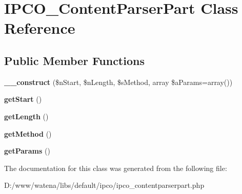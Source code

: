 \hypertarget{class_i_p_c_o___content_parser_part}{\section{I\-P\-C\-O\-\_\-\-Content\-Parser\-Part Class Reference}
\label{class_i_p_c_o___content_parser_part}
}
\subsection*{Public Member Functions}
\begin{DoxyCompactItemize}
\item 
\hypertarget{class_i_p_c_o___content_parser_part_a498d288bf104e4816d20548f2dba801f}{{\bfseries \-\_\-\-\_\-construct} (\$n\-Start, \$n\-Length, \$s\-Method, array \$a\-Params=array())}\label{class_i_p_c_o___content_parser_part_a498d288bf104e4816d20548f2dba801f}

\item 
\hypertarget{class_i_p_c_o___content_parser_part_ab5c89860a31a83016e14b6324b01b031}{{\bfseries get\-Start} ()}\label{class_i_p_c_o___content_parser_part_ab5c89860a31a83016e14b6324b01b031}

\item 
\hypertarget{class_i_p_c_o___content_parser_part_a29eb2064d0c5c701f3b61d142ba79dc8}{{\bfseries get\-Length} ()}\label{class_i_p_c_o___content_parser_part_a29eb2064d0c5c701f3b61d142ba79dc8}

\item 
\hypertarget{class_i_p_c_o___content_parser_part_ad3c00520bed3da649b8beaebb53098d6}{{\bfseries get\-Method} ()}\label{class_i_p_c_o___content_parser_part_ad3c00520bed3da649b8beaebb53098d6}

\item 
\hypertarget{class_i_p_c_o___content_parser_part_a3accae2535c178e2ea8395b1e80ce26d}{{\bfseries get\-Params} ()}\label{class_i_p_c_o___content_parser_part_a3accae2535c178e2ea8395b1e80ce26d}

\end{DoxyCompactItemize}


The documentation for this class was generated from the following file\-:\begin{DoxyCompactItemize}
\item 
D\-:/www/watena/libs/default/ipco/ipco\-\_\-contentparserpart.\-php\end{DoxyCompactItemize}
